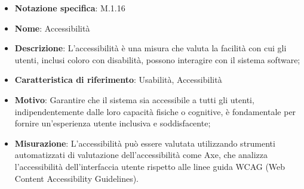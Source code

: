 \begin{itemize}
    \item \textbf{Notazione specifica}: M.1.16
    \item \textbf{Nome}: Accessibilità
    \item \textbf{Descrizione}: L'accessibilità è una misura che valuta la facilità con cui gli utenti, inclusi coloro con disabilità, possono interagire con il sistema software;
    \item \textbf{Caratteristica di riferimento}: Usabilità, Accessibilità
    \item \textbf{Motivo}: Garantire che il sistema sia accessibile a tutti gli utenti, indipendentemente dalle loro capacità fisiche o cognitive, è fondamentale per fornire un'esperienza utente inclusiva e soddisfacente;
    \item \textbf{Misurazione}: L'accessibilità può essere valutata utilizzando strumenti automatizzati di valutazione dell'accessibilità come Axe, che analizza l'accessibilità dell'interfaccia utente rispetto alle linee guida WCAG (Web Content Accessibility Guidelines).
\end{itemize}
